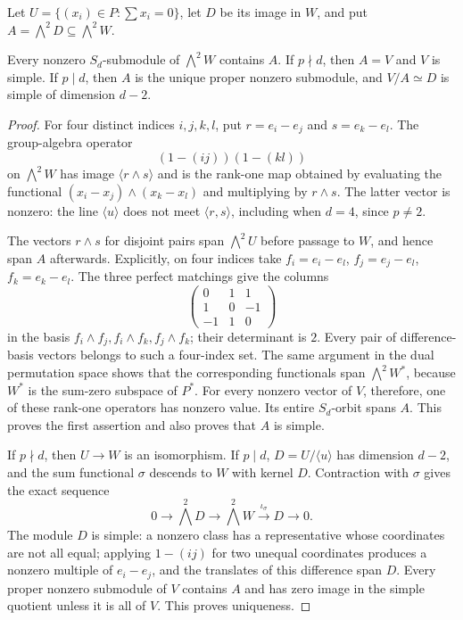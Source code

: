 Let $U=\{(x_i)\in P:\sum x_i=0\}$, let $D$ be its image in $W$, and
put $A=\bigwedge^2D\subseteq\bigwedge^2W$.

\begin{lemma}\label{lem:odd-wedge-submodules}
Every nonzero $S_d$-submodule of $\bigwedge^2W$ contains $A$.
If $p\nmid d$, then $A=V$ and $V$ is simple.  If $p\mid d$, then
$A$ is the unique proper nonzero submodule, and $V/A\simeq D$ is
simple of dimension $d-2$.
\end{lemma}

\begin{proof}
For four distinct indices $i,j,k,l$, put $r=e_i-e_j$ and $s=e_k-e_l$.
The group-algebra operator
\[
 (1-(ij))(1-(kl))
\]
on $\bigwedge^2W$ has image $\langle r\wedge s\rangle$ and is the
rank-one map obtained by evaluating the functional
$(x_i-x_j)\wedge(x_k-x_l)$ and multiplying by $r\wedge s$.
The latter vector is nonzero: the line $\langle u\rangle$ does not
meet $\langle r,s\rangle$, including when $d=4$, since $p\ne2$.

The vectors $r\wedge s$ for disjoint pairs span $\bigwedge^2U$ before
passage to $W$, and hence span $A$ afterwards.  Explicitly, on four
indices take $f_i=e_i-e_l$, $f_j=e_j-e_l$, $f_k=e_k-e_l$.  The three
perfect matchings give the columns
\[
 \begin{pmatrix}0&1&1\\1&0&-1\\-1&1&0\end{pmatrix}
\]
in the basis $f_i\wedge f_j,f_i\wedge f_k,f_j\wedge f_k$; their
determinant is $2$.  Every pair of difference-basis vectors belongs to
such a four-index set.  The same argument in the dual permutation
space shows that the corresponding functionals span
$\bigwedge^2W^*$, because $W^*$ is the sum-zero subspace of $P^*$.
For every nonzero vector of $V$, therefore, one of these rank-one
operators has nonzero value.  Its entire $S_d$-orbit spans $A$.
This proves the first assertion and also proves that $A$ is simple.

If $p\nmid d$, then $U\to W$ is an isomorphism.  If $p\mid d$,
$D=U/\langle u\rangle$ has dimension $d-2$, and the sum functional
$\sigma$ descends to $W$ with kernel $D$.  Contraction with $\sigma$
gives the exact sequence
\[
 0\longrightarrow\bigwedge^2D\longrightarrow\bigwedge^2W
 \xrightarrow{\ \iota_\sigma\ }D\longrightarrow0.
\]
The module $D$ is simple: a nonzero class has a representative whose
coordinates are not all equal; applying $1-(ij)$ for two unequal
coordinates produces a nonzero multiple of $e_i-e_j$, and the
translates of this difference span $D$.  Every proper nonzero
submodule of $V$ contains $A$ and has zero image in the simple
quotient unless it is all of $V$.  This proves uniqueness.
\end{proof}

